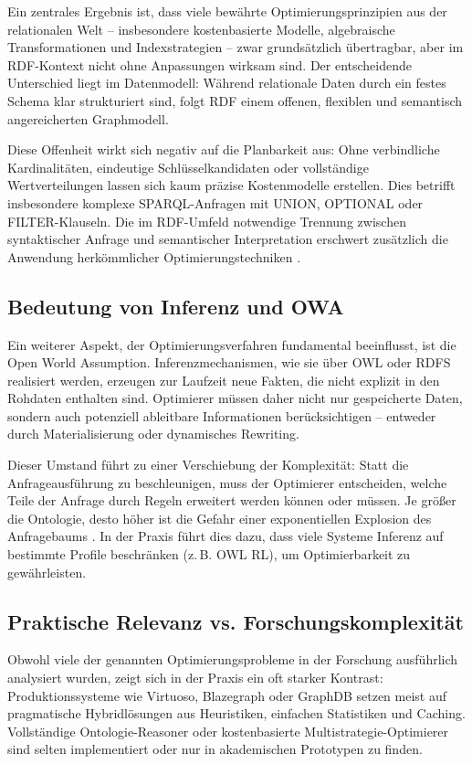 \documentclass[12pt]{article}
\begin{document}
Ein zentrales Ergebnis ist, dass viele bewährte Optimierungsprinzipien aus der relationalen Welt – insbesondere kostenbasierte Modelle, algebraische Transformationen und Indexstrategien – zwar grundsätzlich übertragbar, aber im RDF-Kontext nicht ohne Anpassungen wirksam sind. Der entscheidende Unterschied liegt im Datenmodell: Während relationale Daten durch ein festes Schema klar strukturiert sind, folgt RDF einem offenen, flexiblen und semantisch angereicherten Graphmodell.

Diese Offenheit wirkt sich negativ auf die Planbarkeit aus: Ohne verbindliche Kardinalitäten, eindeutige Schlüsselkandidaten oder vollständige Wertverteilungen lassen sich kaum präzise Kostenmodelle erstellen. Dies betrifft insbesondere komplexe SPARQL-Anfragen mit UNION, OPTIONAL oder FILTER-Klauseln. Die im RDF-Umfeld notwendige Trennung zwischen syntaktischer Anfrage und semantischer Interpretation erschwert zusätzlich die Anwendung herkömmlicher Optimierungstechniken \cite{nourie2021survey}.

\subsection{Bedeutung von Inferenz und OWA}

Ein weiterer Aspekt, der Optimierungsverfahren fundamental beeinflusst, ist die Open World Assumption. Inferenzmechanismen, wie sie über OWL oder RDFS realisiert werden, erzeugen zur Laufzeit neue Fakten, die nicht explizit in den Rohdaten enthalten sind. Optimierer müssen daher nicht nur gespeicherte Daten, sondern auch potenziell ableitbare Informationen berücksichtigen – entweder durch Materialisierung oder dynamisches Rewriting.

Dieser Umstand führt zu einer Verschiebung der Komplexität: Statt die Anfrageausführung zu beschleunigen, muss der Optimierer entscheiden, welche Teile der Anfrage durch Regeln erweitert werden können oder müssen. Je größer die Ontologie, desto höher ist die Gefahr einer exponentiellen Explosion des Anfragebaums \cite{tsatsanifos2012ontologies}. In der Praxis führt dies dazu, dass viele Systeme Inferenz auf bestimmte Profile beschränken (z.\,B. OWL RL), um Optimierbarkeit zu gewährleisten.

\subsection{Praktische Relevanz vs. Forschungskomplexität}

Obwohl viele der genannten Optimierungsprobleme in der Forschung ausführlich analysiert wurden, zeigt sich in der Praxis ein oft starker Kontrast: Produktionssysteme wie Virtuoso, Blazegraph oder GraphDB setzen meist auf pragmatische Hybridlösungen aus Heuristiken, einfachen Statistiken und Caching. Vollständige Ontologie-Reasoner oder kostenbasierte Multistrategie-Optimierer sind selten implementiert oder nur in akademischen Prototypen zu finden.
\end{document}
